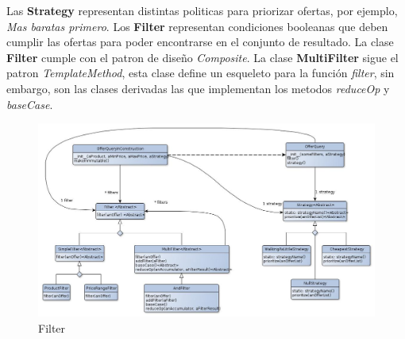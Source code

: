 \documentclass[10pt, a4paper]{article}
\begin{document}
\begin{landscape}
Las \textbf{Strategy} representan distintas politicas para priorizar ofertas, por ejemplo, \emph{Mas baratas primero}.
Los \textbf{Filter} representan condiciones booleanas que deben cumplir las ofertas para poder encontrarse en el conjunto de resultado. La clase \textbf{Filter} cumple con el patron de diseño \emph{Composite}. La clase \textbf{MultiFilter} sigue el patron \emph{TemplateMethod}, esta clase define un esqueleto para la función \emph{filter}, sin embargo, son las clases derivadas las que implementan los metodos \emph{reduceOp} y \emph{baseCase}.

\begin{figure}[H]
\centering
\includegraphics[scale=0.6]{graphics/filter_class.jpg}
\caption{Filter}
\end{figure}



\newpage

\end{landscape}
\end{document}
